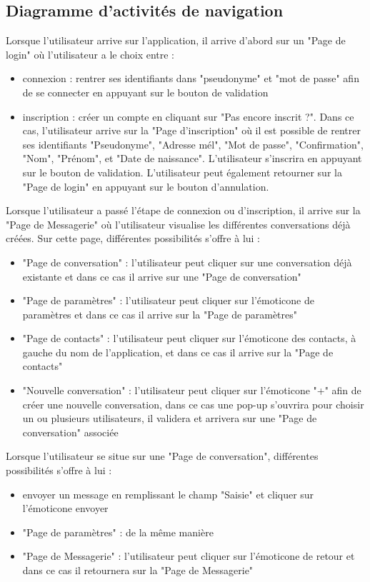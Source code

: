 	\newpage

	\subsection{Diagramme d'activités de navigation}
	Lorsque l'utilisateur arrive sur l'application, il arrive d'abord sur un "Page de login" où l'utilisateur a le choix entre :
	\begin{itemize}
		\item connexion : rentrer ses identifiants dans "pseudonyme" et "mot de passe" afin de se connecter en appuyant sur le bouton de validation
		\item inscription : créer un compte en cliquant sur "Pas encore inscrit ?".
		Dans ce cas, l'utilisateur arrive sur la "Page d'inscription" où il est possible de rentrer ses identifiants "Pseudonyme", "Adresse mél", "Mot de passe", "Confirmation", "Nom", "Prénom", et "Date de naissance".
		L'utilisateur s'inscrira en appuyant sur le bouton de validation.
		L'utilisateur peut également retourner sur la "Page de login" en appuyant sur le bouton d'annulation.\\
	\end{itemize}

	Lorsque l'utilisateur a passé l'étape de connexion ou d'inscription, il arrive sur la "Page de Messagerie" où l'utilisateur visualise les différentes conversations déjà créées. Sur cette page, différentes possibilités s'offre à lui :
	\begin{itemize}
		\item "Page de conversation" : l'utilisateur peut cliquer sur une conversation déjà existante et dans ce cas il arrive sur une "Page de conversation"
		\item "Page de paramètres" : l'utilisateur peut cliquer sur l'émoticone de paramètres et dans ce cas il arrive sur la "Page de paramètres"
		\item "Page de contacts" : l'utilisateur peut cliquer sur l'émoticone des contacts, à gauche du nom de l'application, et dans ce cas il arrive sur la "Page de contacts"
		\item "Nouvelle conversation" : l'utilisateur peut cliquer sur l'émoticone "+" afin de créer une nouvelle conversation, dans ce cas une pop-up s'ouvrira pour choisir un ou plusieurs utilisateurs, il validera et arrivera sur une "Page de conversation" associée\\
	\end{itemize}

	Lorsque l'utilisateur se situe sur une "Page de conversation", différentes possibilités s'offre à lui :
	\begin{itemize}
		\item envoyer un message en remplissant le champ "Saisie" et cliquer sur l'émoticone envoyer
		\item "Page de paramètres" : de la même manière
		\item "Page de Messagerie" : l'utilisateur peut cliquer sur l'émoticone de retour et dans ce cas il retournera sur la "Page de Messagerie"\\
	\end{itemize}

